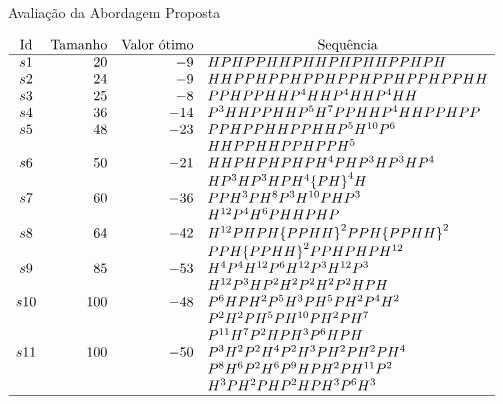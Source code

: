 \begin{frame}[allowframebreaks]{Avaliação da Abordagem Proposta}	
		\begin{table}[!htb]
			\begin{center}		
				\label{tab:sequences}
				{$\begin{array}{c r r l}
					\text{Id} & \text{Tamanho} &  \multicolumn{1}{c}{\text{Valor ótimo}} & \multicolumn{1}{c}{\text{Sequência}} \\ \hline
					s1 &20 &-9 & HPHPPHHPHHPHPHHPPHPH \\
					s2 &24 &-9 & HHPPHPPHPPHPPHPPHPPHPPHH \\
					s3 &25 &-8 & PPHPPHHP^4HHP^4HHP^4HH \\
					s4 &36 &-14 &  P^3HHPPHHP^5H^7PPHHP^4HHPPHPP\\
					s5 &48 &-23 &  PPHPPHHPPHHP^5H^{10}P^6 \\
					&   &    &  HHPPHHPPHPPH^5 \\
					s6 &50 &-21 &  HHPHPHPHPH^4PHP^3HP^3HP^4 \\
					&   &    & HP^3HP^3HPH^4{\{PH\}}^4H\\
					s7 &60 &-36 &  PPH^3PH^8P^3H^{10}PHP^3\\
					&   &    &  H^{12}P^4H^6PHHPHP\\
					s8 &64 &-42 &   H^{12}PHPH{\{PPHH\}}^2PPH{\{PPHH\}}^2\\
					&   &    &  PPH{\{PPHH\}}^2PPHPHPH^{12}\\
					s9  &85   &-53  & H^4P^4H^{12}P^6 H^{12} P^3 H^{12} P^3 \\
					&   &    &    H^{12} P^3  H P^2 H^2    P^2 H^2  P^2 H P H  \\
					s10  &100  &-48  &  P^6HPH^{2}P^5H^{3}PH^5PH^{2} P^4 H^{2} \\
					&   &    &   P^2  H^2 P  H^5  P H^{10} P H^{2} P H^{7}  \\
					&   &    &  P^{11} H^{7} P^2  H P   H^3  P^{6} H P H \\
					s11 &100  &-50  &  P^3H^{2}P^2H^{4}P^2H^{3}PH^{2} PH^{2}PH^{4} \\
					&   &    & P^8 H^6 P^{2} H^{6} P^{9} H P H^{2} P  H^{11} P^2  \\
					&   &    &H^3 P  H^{2} P H P^2  H P H^3 P^6 H^3\\ \hline
					\end{array}$}
			\end{center}
				\caption{Sequências que serão utilizadas para avaliar e comparar os resultados obtidos pela abordagem proposta}
		\end{table}
\end{frame}


